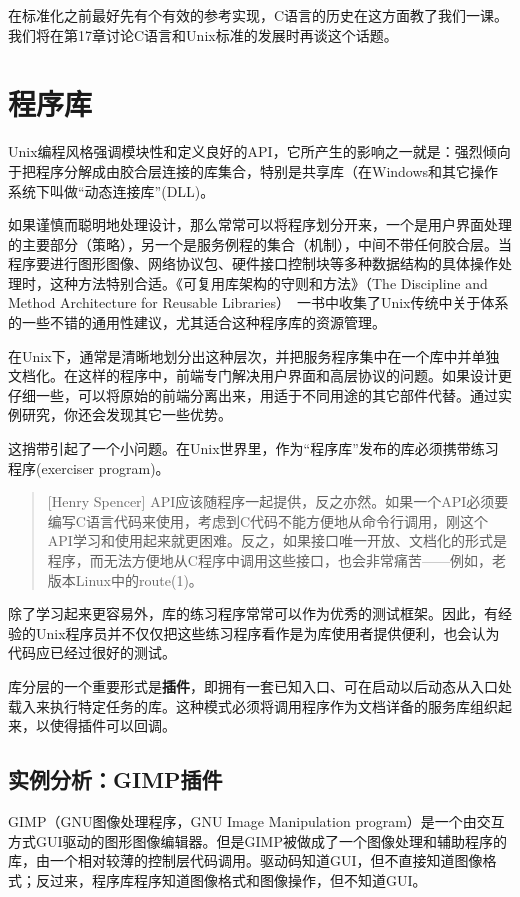 \documentclass[12pt,oneside]{ctexbook}
\begin{document}
\begin{common-format}
在标准化之前最好先有个有效的参考实现，C语言的历史在这方面教了我们一课。我们将在第17章讨论C语言和Unix标准的发展时再谈这个话题。


\section{程序库}
Unix编程风格强调模块性和定义良好的API，它所产生的影响之一就是：强烈倾向于把程序分解成由胶合层连接的库集合，特别是共享库（在Windows和其它操作系统下叫做“动态连接库”(DLL)。

如果谨慎而聪明地处理设计，那么常常可以将程序划分开来，一个是用户界面处理的主要部分（策略），另一个是服务例程的集合（机制），中间不带任何胶合层。当程序要进行图形图像、网络协议包、硬件接口控制块等多种数据结构的具体操作处理时，这种方法特别合适。《可复用库架构的守则和方法》（The Discipline and Method Architecture for Reusable Libraries）~\cite{Vo}一书中收集了Unix传统中关于体系的一些不错的通用性建议，尤其适合这种程序库的资源管理。

在Unix下，通常是清晰地划分出这种层次，并把服务程序集中在一个库中并单独文档化。在这样的程序中，前端专门解决用户界面和高层协议的问题。如果设计更仔细一些，可以将原始的前端分离出来，用适于不同用途的其它部件代替。通过实例研究，你还会发现其它一些优势。

这捎带引起了一个小问题。在Unix世界里，作为“程序库”发布的库必须携带练习程序(exerciser program)。

\begin{quote}[Henry Spencer]
API应该随程序一起提供，反之亦然。如果一个API必须要编写C语言代码来使用，考虑到C代码不能方便地从命令行调用，刚这个API学习和使用起来就更困难。反之，如果接口唯一开放、文档化的形式是程序，而无法方便地从C程序中调用这些接口，也会非常痛苦——例如，老版本Linux中的route(1)。
\end{quote}

除了学习起来更容易外，库的练习程序常常可以作为优秀的测试框架。因此，有经验的Unix程序员并不仅仅把这些练习程序看作是为库使用者提供便利，也会认为代码应已经过很好的测试。

库分层的一个重要形式是\textbf{插件}，即拥有一套已知入口、可在启动以后动态从入口处载入来执行特定任务的库。这种模式必须将调用程序作为文档详备的服务库组织起来，以使得插件可以回调。


\subsection{实例分析：GIMP插件}
GIMP（GNU图像处理程序，GNU Image Manipulation program）是一个由交互方式GUI驱动的图形图像编辑器。但是GIMP被做成了一个图像处理和辅助程序的库，由一个相对较薄的控制层代码调用。驱动码知道GUI，但不直接知道图像格式；反过来，程序库程序知道图像格式和图像操作，但不知道GUI。


\end{common-format}
\end{document}
